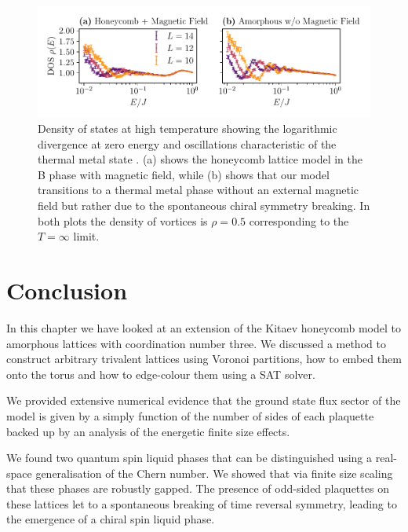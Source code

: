 \begin{figure}
\hypertarget{fig:DOS_oscillations}{%
\centering
\includegraphics[width=1\textwidth,height=\textheight]{figure_code/amk_chapter/results/DOS_oscillations/DOS_oscillations.pdf}
\caption{Density of states at high temperature showing the logarithmic divergence at zero energy and oscillations characteristic of the thermal metal state \autocite{bocquet_disordered_2000,selfThermallyInducedMetallic2019}. (a) shows the honeycomb lattice model in the B phase with magnetic field, while (b) shows that our model transitions to a thermal metal phase without an external magnetic field but rather due to the spontaneous chiral symmetry breaking. In both plots the density of vortices is \(\rho = 0.5\) corresponding to the \(T = \infty\) limit.}\label{fig:DOS_oscillations}
}
\end{figure}

\hypertarget{conclusion}{%
\section{Conclusion}\label{conclusion}}

In this chapter we have looked at an extension of the Kitaev honeycomb model to amorphous lattices with coordination number three. We discussed a method to construct arbitrary trivalent lattices using Voronoi partitions, how to embed them onto the torus and how to edge-colour them using a SAT solver.

We provided extensive numerical evidence that the ground state flux sector of the model is given by a simply function of the number of sides of each plaquette backed up by an analysis of the energetic finite size effects.

We found two quantum spin liquid phases that can be distinguished using a real-space generalisation of the Chern number. We showed that via finite size scaling that these phases are robustly gapped. The presence of odd-sided plaquettes on these lattices let to a spontaneous breaking of time reversal symmetry, leading to the emergence of a chiral spin liquid phase.

